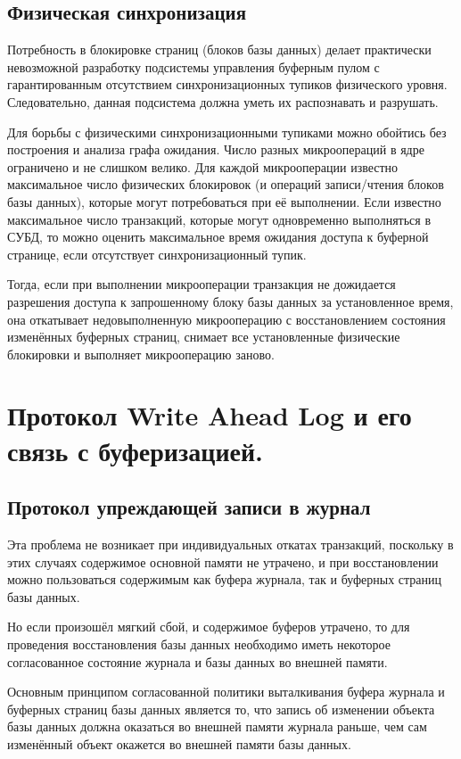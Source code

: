 \documentclass[a4paper,12pt]{article}
\begin{document}
\subsection{Физическая синхронизация}

Потребность в блокировке страниц (блоков базы данных) делает практически невозможной разработку подсистемы управления буферным пулом с гарантированным отсутствием синхронизационных тупиков физического уровня. Следовательно, данная подсистема должна уметь их распознавать и разрушать.

Для борьбы с физическими синхронизационными тупиками можно обойтись без построения и анализа графа ожидания. Число разных микроопераций в ядре ограничено и не слишком велико. Для каждой микрооперации известно максимальное число физических блокировок (и операций записи/чтения блоков базы данных), которые могут потребоваться при её выполнении. Если известно максимальное число транзакций, которые могут одновременно выполняться в СУБД, то можно оценить максимальное время ожидания доступа к буферной странице, если отсутствует синхронизационный тупик.

Тогда, если при выполнении микрооперации транзакция не дожидается разрешения доступа к запрошенному блоку базы данных за установленное время, она откатывает недовыполненную микрооперацию с восстановлением состояния изменённых буферных страниц, снимает все установленные физические блокировки и выполняет микрооперацию заново.

\section{Протокол Write Ahead Log и его связь с буферизацией.}

\subsection{Протокол упреждающей записи в журнал}

Эта проблема не возникает при индивидуальных откатах транзакций, поскольку в этих случаях содержимое основной памяти не утрачено, и при восстановлении можно пользоваться содержимым как буфера журнала, так и буферных страниц базы данных.

Но если произошёл мягкий сбой, и содержимое буферов утрачено, то для проведения восстановления базы данных необходимо иметь некоторое согласованное состояние журнала и базы данных во внешней памяти.

Основным принципом согласованной политики выталкивания буфера журнала и буферных страниц базы данных является то, что запись об изменении объекта базы данных должна оказаться во внешней памяти журнала раньше, чем сам изменённый объект окажется во внешней памяти базы данных.
\end{document}
